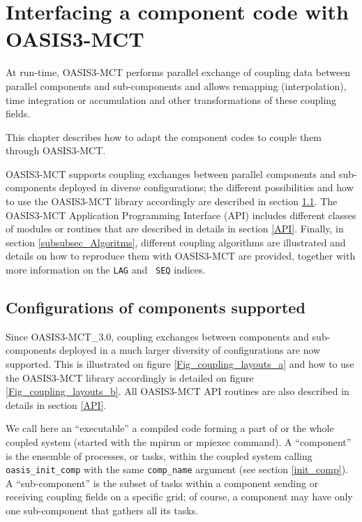 \newpage
\chapter{Interfacing a component code with OASIS3-MCT}
\label{sec_modelinterfacing}

At run-time, OASIS3-MCT performs parallel exchange of coupling data between parallel
components and sub-components and allows remapping (interpolation), time integration or accumulation and other transformations of these coupling fields. 

This chapter describes how to adapt the component codes to couple them through OASIS3-MCT. 

OASIS3-MCT supports coupling exchanges between parallel
components and sub-components deployed in diverse
configurations; the different possibilities and how to use
the OASIS3-MCT library accordingly are described in section
\ref{sec_deploy}. 
The OASIS3-MCT Application Programming Interface (API) includes different classes of modules or routines that are described in details in section \ref{API}.
Finally, in section \ref{subsubsec_Algoritms}, different coupling
algorithms are illustrated and details on how to reproduce them with
OASIS3-MCT are provided, together with more information on the {\tt LAG} and {\tt
  SEQ} indices.

\section{Configurations of components supported}
\label{sec_deploy}

Since OASIS3-MCT\_3.0, coupling exchanges between components and
sub-components deployed in a much larger diversity of configurations
are now supported. This is illustrated on figure
\ref{Fig_coupling_layouts_a} and how to use the OASIS3-MCT library
accordingly is detailed on figure \ref{Fig_coupling_layouts_b}. All
OASIS3-MCT API routines are also described in details in section
\ref{API}. 

We call here an ``executable'' a compiled code
  forming a part of or the whole coupled system (started with the
  mpirun or mpiexec command). A ``component'' is the ensemble of
  processes, or tasks, within the coupled system calling {\tt oasis\_init\_comp}
  with the same {\tt comp\_name} argument (see section
  \ref{init_comp}). A ``sub-component'' is the subset of tasks within a
  component sending or receiving coupling fields on a specific grid;
  of course, a component may have only one sub-component
  that gathers all its tasks.

